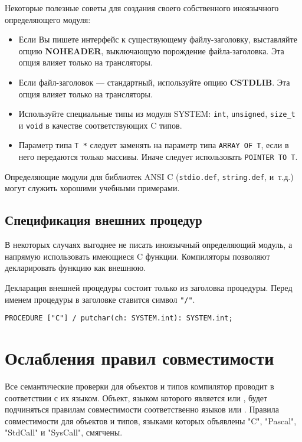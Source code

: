 Некоторые полезные советы для  создания своего собственного иноязычного
определяющего модуля:
\begin{itemize}
\item
Если Вы пишете интерфейс к существующему файлу-заголовку,
выставляйте опцию {\bf NOHEADER}, выключающую порождение файла-заголовка.
Эта опция влияет только на трансляторы.

\item
Если файл-заголовок --- стандартный, используйте опцию {\bf CSTDLIB}.
Эта опция влияет только на трансляторы.

\item
Используйте специальные типы из модуля SYSTEM: {\tt int}, {\tt unsigned},
\verb|size_t| и {\tt void} в качестве соответствующих C типов.

\item
Параметр типа \verb|T *| следует заменять на параметр типа
{\tt ARRAY OF T}, если в него передаются только массивы. Иначе 
следует использовать {\tt POINTER TO T}.

\end{itemize}
Определяющие модули для библиотек ANSI C ({\tt stdio.def},
{\tt string.def}, и~т.д.) могут служить хорошими учебными примерами.

\subsection{Спецификация внешних процедур}\label{multilang:extproc}

В некоторых случаях выгоднее не писать иноязычный 
определяющий модуль, а напрямую использовать имеющиеся C функции.
Компиляторы \xds{} позволяют декларировать функцию как внешнюю.

Декларация внешней процедуры состоит только из заголовка процедуры.
Перед именем процедуры в заголовке ставится символ \verb|"/"|.
\begin{verbatim}
PROCEDURE ["C"] / putchar(ch: SYSTEM.int): SYSTEM.int;
\end{verbatim}


\section{Ослабления правил совместимости}

Все семантические проверки для объектов и типов компилятор проводит
в соответствии с их языком. Объект, языком которого является
\mt{} или \ot{}, будет подчиняться правилам совместимости соответственно
языков \mt{} или \ot{}.
Правила совместимости для объектов и типов, языками которых объявлены
"C", "Pascal", "StdCall" и "SysCall", смягчены.


